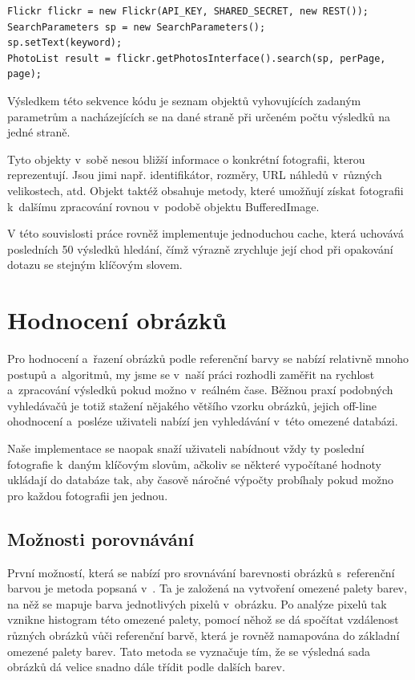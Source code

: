 \documentclass[12pt,oneside,a4paper]{article}
\newenvironment{listing}
{\begin{list}{}{\setlength{\leftmargin}{1em}}\item\scriptsize\bfseries}
{\end{list}}
\begin{document}
\begin{listing}
\begin{verbatim}
Flickr flickr = new Flickr(API_KEY, SHARED_SECRET, new REST());
SearchParameters sp = new SearchParameters();
sp.setText(keyword);
PhotoList result = flickr.getPhotosInterface().search(sp, perPage, page);
\end{verbatim}
\end{listing}

Výsledkem této sekvence kódu je seznam objektů vyhovujících zadaným parametrům a nacházejících se na dané straně při určeném počtu výsledků na jedné straně.

Tyto objekty v~sobě nesou bližší informace o konkrétní fotografii, kterou reprezentují. Jsou jimi např. identifikátor, rozměry, URL náhledů v~různých velikostech, atd. Objekt taktéž obsahuje metody, které umožňují získat fotografii k~dalšímu zpracování rovnou v~podobě objektu BufferedImage.

V této souvislosti práce rovněž implementuje jednoduchou cache, která uchovává posledních 50 výsledků hledání, čímž výrazně zrychluje její chod při opakování dotazu se stejným klíčovým slovem.

\section{Hodnocení obrázků}
Pro hodnocení a~řazení obrázků podle referenční barvy se nabízí relativně mnoho postupů a~algoritmů, my jsme se v~naší práci rozhodli zaměřit na rychlost a~zpracování výsledků pokud možno v~reálném čase. Běžnou praxí podobných vyhledávačů je totiž stažení nějakého většího vzorku obrázků, jejich off-line ohodnocení a~posléze uživateli nabízí jen vyhledávání v~této omezené databázi.

Naše implementace se naopak snaží uživateli nabídnout vždy ty poslední fotografie k~daným klíčovým slovům, ačkoliv se některé vypočítané hodnoty ukládají do databáze tak, aby časově náročné výpočty probíhaly pokud možno pro každou fotografii jen jednou.

\subsection{Možnosti porovnávání}
První možností, která se nabízí pro srovnávání barevnosti obrázků s~referenční barvou je metoda popsaná v~\cite{Mueller2k9}. Ta je založená na vytvoření omezené palety barev, na něž se mapuje barva jednotlivých pixelů v~obrázku. Po analýze pixelů tak vznikne histogram této omezené palety, pomocí něhož se dá spočítat vzdálenost různých obrázků vůči referenční barvě, která je rovněž namapována do základní omezené palety barev. Tato metoda se vyznačuje tím, že se výsledná sada obrázků dá velice snadno dále třídit podle dalších barev.
\end{document}
